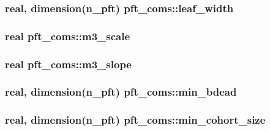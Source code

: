 \subsubsection[{\texorpdfstring{leaf\+\_\+width}{leaf_width}}]{\setlength{\rightskip}{0pt plus 5cm}real, dimension(n\+\_\+pft) pft\+\_\+coms\+::leaf\+\_\+width}\hypertarget{namespacepft__coms_ac9aba7609beabf8387afac8a12a89d5c}{}\label{namespacepft__coms_ac9aba7609beabf8387afac8a12a89d5c}
\subsubsection[{\texorpdfstring{m3\+\_\+scale}{m3_scale}}]{\setlength{\rightskip}{0pt plus 5cm}real pft\+\_\+coms\+::m3\+\_\+scale}\hypertarget{namespacepft__coms_ad41cac7d6fa0b8d962cf3acd1d4b1587}{}\label{namespacepft__coms_ad41cac7d6fa0b8d962cf3acd1d4b1587}
\subsubsection[{\texorpdfstring{m3\+\_\+slope}{m3_slope}}]{\setlength{\rightskip}{0pt plus 5cm}real pft\+\_\+coms\+::m3\+\_\+slope}\hypertarget{namespacepft__coms_a27553d075979c77be9aceaf78a289109}{}\label{namespacepft__coms_a27553d075979c77be9aceaf78a289109}
\subsubsection[{\texorpdfstring{min\+\_\+bdead}{min_bdead}}]{\setlength{\rightskip}{0pt plus 5cm}real, dimension(n\+\_\+pft) pft\+\_\+coms\+::min\+\_\+bdead}\hypertarget{namespacepft__coms_af689fc3f0c233590c72175bf99d1c8f6}{}\label{namespacepft__coms_af689fc3f0c233590c72175bf99d1c8f6}
\subsubsection[{\texorpdfstring{min\+\_\+cohort\+\_\+size}{min_cohort_size}}]{\setlength{\rightskip}{0pt plus 5cm}real, dimension(n\+\_\+pft) pft\+\_\+coms\+::min\+\_\+cohort\+\_\+size}\hypertarget{namespacepft__coms_ae271b74cd105b2cf539a630a97cfc185}{}\label{namespacepft__coms_ae271b74cd105b2cf539a630a97cfc185}
